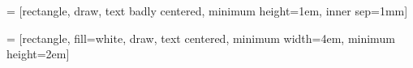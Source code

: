 
\newcommand{\propnode}[5]{%
	\pgfmathsetmacro{\minimalwidth}{sqrt (#4*\nodebasesize)}
	\node[#3,minimum width=\minimalwidth*1cm,inner sep=\nodeinnersep*0cm,circle,draw] 
	(#2) at (#1) {#5};
}

 = [rectangle, draw, text badly centered, minimum height=1em, inner sep=1mm]
\newcommand{\bloq}[4]{%
	\node[bloq,#3] (#2) at (#1) {\tiny\textsf{#4}}; 
}
\newcommand{\add}[2]{%
	\draw (4,4) circle [radius=0.3] node (add) {\tiny\textsfi$+$};
}

 =
[rectangle, fill=white, draw, text centered, minimum width=4em, minimum height=2em]

